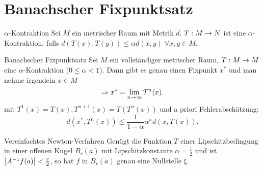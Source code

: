 \documentclass[main.tex]{subfiles}
\begin{document}
\section*{Banachscher Fixpunktsatz}

\begin{karte}{\(\alpha\)-Kontraktion}
    Sei \( M \) ein metrischer Raum mit Metrik \(d\). \( T : M \rightarrow N \) ist 
    eine \( \alpha \)-Kontraktion, falls \( d(T(x), T(y)) \leq \alpha d(x,y) 
    \;\forall x,y\in M \).
\end{karte}

\begin{karte}{Banachscher Fixpunktsatz}
    Sei \( M \) ein vollständiger metrischer Raum, \( T : M \rightarrow M \) 
    eine \( \alpha \)-Kontraktion (\( 0 \leq \alpha < 1 \)). Dann gibt 
    es genau einen Fixpunkt \( x^* \) und man nehme irgendein \( x \in M \) 
    \[ \Rightarrow x^* = \lim\limits_{n\rightarrow\infty} T^n(x). \]
    mit \( T^1(x) = T(x), T^{n+1}(x) = T(T^n(x)) \)
    und a priori Fehlerabschätzung: 
    \[ d(x^*, T^n(x)) \leq \frac{1}{1-\alpha} \alpha^n d(x, T(x)). \]
\end{karte}

\begin{karte}{Vereinfachtes Newton-Verfahren}
    Genügt die Funktion \(T\) einer Lipschitzbedingung
    in einer offenen Kugel \( B_r(a) \) mit 
    Lipschitzkonstante \( \alpha = \frac{1}{2} \) 
    und ist \(\left| A^{-1} f(a) \right| < \frac{r}{2}\), so hat \(f\)
    in \(B_r(a)\) genau eine Nullstelle \(\xi\).
\end{karte}
\end{document}
